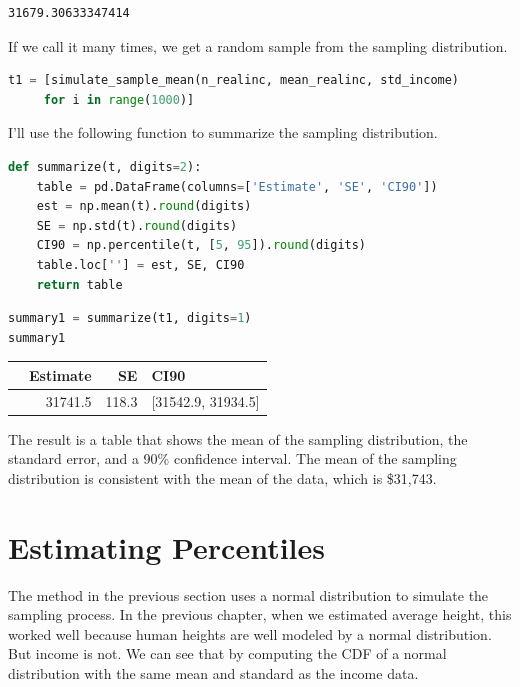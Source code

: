 \begin{lstlisting}[style=output]
31679.30633347414
\end{lstlisting}

If we call it many times, we get a random sample from the sampling
distribution.

\begin{lstlisting}[language=Python,style=source]
t1 = [simulate_sample_mean(n_realinc, mean_realinc, std_income)
     for i in range(1000)]
\end{lstlisting}

I'll use the following function to summarize the sampling distribution.

\begin{lstlisting}[language=Python,style=source]
def summarize(t, digits=2):
    table = pd.DataFrame(columns=['Estimate', 'SE', 'CI90'])
    est = np.mean(t).round(digits)
    SE = np.std(t).round(digits)
    CI90 = np.percentile(t, [5, 95]).round(digits)
    table.loc[''] = est, SE, CI90
    return table
\end{lstlisting}

\begin{lstlisting}[language=Python,style=source]
summary1 = summarize(t1, digits=1)
summary1
\end{lstlisting}

\begin{tabular}{lrrl}
\toprule
{} &  Estimate &     SE &                CI90 \\
\midrule
{} &   31741.5 &  118.3 &  [31542.9, 31934.5] \\
\bottomrule
\end{tabular}

The result is a table that shows the mean of the sampling distribution,
the standard error, and a 90\% confidence interval. The mean of the
sampling distribution is consistent with the mean of the data, which is
\$31,743.

\hypertarget{estimating-percentiles}{%
\section{Estimating Percentiles}\label{estimating-percentiles}}

The method in the previous section uses a normal distribution to
simulate the sampling process. In the previous chapter, when we
estimated average height, this worked well because human heights are
well modeled by a normal distribution. But income is not. We can see
that by computing the CDF of a normal distribution with the same mean
and standard as the income data.

